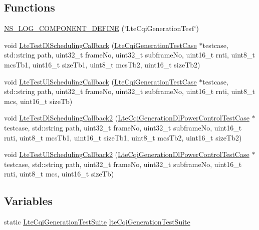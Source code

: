 \subsection*{Functions}
\begin{DoxyCompactItemize}
\item 
\hyperlink{lte-test-cqi-generation_8cc_a77dfc708199faf2aa133a4a7e80ea3f5}{N\+S\+\_\+\+L\+O\+G\+\_\+\+C\+O\+M\+P\+O\+N\+E\+N\+T\+\_\+\+D\+E\+F\+I\+NE} (\char`\"{}Lte\+Cqi\+Generation\+Test\char`\"{})
\item 
void \hyperlink{lte-test-cqi-generation_8cc_a522fab31a011a1cce14b7026c69096eb}{Lte\+Test\+Dl\+Scheduling\+Callback} (\hyperlink{classLteCqiGenerationTestCase}{Lte\+Cqi\+Generation\+Test\+Case} $\ast$testcase, std\+::string path, uint32\+\_\+t frame\+No, uint32\+\_\+t subframe\+No, uint16\+\_\+t rnti, uint8\+\_\+t mcs\+Tb1, uint16\+\_\+t size\+Tb1, uint8\+\_\+t mcs\+Tb2, uint16\+\_\+t size\+Tb2)
\item 
void \hyperlink{lte-test-cqi-generation_8cc_a2e901ba26bace6b64096f7fc39bd0345}{Lte\+Test\+Ul\+Scheduling\+Callback} (\hyperlink{classLteCqiGenerationTestCase}{Lte\+Cqi\+Generation\+Test\+Case} $\ast$testcase, std\+::string path, uint32\+\_\+t frame\+No, uint32\+\_\+t subframe\+No, uint16\+\_\+t rnti, uint8\+\_\+t mcs, uint16\+\_\+t size\+Tb)
\item 
void \hyperlink{lte-test-cqi-generation_8cc_af8660e0d6de7e7145aef6f7d0006ff27}{Lte\+Test\+Dl\+Scheduling\+Callback2} (\hyperlink{classLteCqiGenerationDlPowerControlTestCase}{Lte\+Cqi\+Generation\+Dl\+Power\+Control\+Test\+Case} $\ast$testcase, std\+::string path, uint32\+\_\+t frame\+No, uint32\+\_\+t subframe\+No, uint16\+\_\+t rnti, uint8\+\_\+t mcs\+Tb1, uint16\+\_\+t size\+Tb1, uint8\+\_\+t mcs\+Tb2, uint16\+\_\+t size\+Tb2)
\item 
void \hyperlink{lte-test-cqi-generation_8cc_acb0c7b78472b3508a4217da80298a936}{Lte\+Test\+Ul\+Scheduling\+Callback2} (\hyperlink{classLteCqiGenerationDlPowerControlTestCase}{Lte\+Cqi\+Generation\+Dl\+Power\+Control\+Test\+Case} $\ast$testcase, std\+::string path, uint32\+\_\+t frame\+No, uint32\+\_\+t subframe\+No, uint16\+\_\+t rnti, uint8\+\_\+t mcs, uint16\+\_\+t size\+Tb)
\end{DoxyCompactItemize}
\subsection*{Variables}
\begin{DoxyCompactItemize}
\item 
static \hyperlink{classLteCqiGenerationTestSuite}{Lte\+Cqi\+Generation\+Test\+Suite} \hyperlink{lte-test-cqi-generation_8cc_add8e30619375e6e72bb20ab29a4db892}{lte\+Cqi\+Generation\+Test\+Suite}
\end{DoxyCompactItemize}


